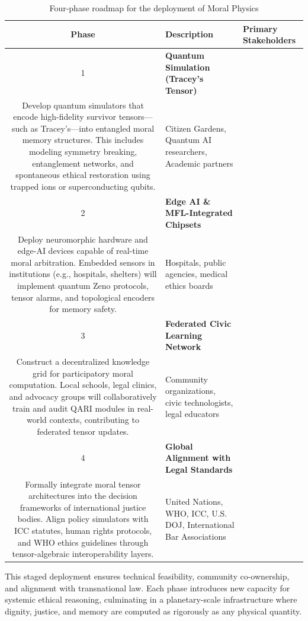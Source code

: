 \documentclass{article}
\theoremstyle{plain}
\theoremstyle{claimstyle}
\begin{document}
\begin{table}[h]
\centering
\begin{tabular}{|c|p{7cm}|p{5cm}|}
\hline
\textbf{Phase} & \textbf{Description} & \textbf{Primary Stakeholders} \\
\hline
1 & \textbf{Quantum Simulation (Tracey’s Tensor)}\\
Develop quantum simulators that encode high-fidelity survivor tensors—such as Tracey’s—into entangled moral memory structures. This includes modeling symmetry breaking, entanglement networks, and spontaneous ethical restoration using trapped ions or superconducting qubits. & Citizen Gardens, Quantum AI researchers, Academic partners \\
\hline
2 & \textbf{Edge AI \& MFL-Integrated Chipsets} \\
Deploy neuromorphic hardware and edge-AI devices capable of real-time moral arbitration. Embedded sensors in institutions (e.g., hospitals, shelters) will implement quantum Zeno protocols, tensor alarms, and topological encoders for memory safety. & Hospitals, public agencies, medical ethics boards \\
\hline
3 & \textbf{Federated Civic Learning Network} \\
Construct a decentralized knowledge grid for participatory moral computation. Local schools, legal clinics, and advocacy groups will collaboratively train and audit QARI modules in real-world contexts, contributing to federated tensor updates. & Community organizations, civic technologists, legal educators \\
\hline
4 & \textbf{Global Alignment with Legal Standards} \\
Formally integrate moral tensor architectures into the decision frameworks of international justice bodies. Align policy simulators with ICC statutes, human rights protocols, and WHO ethics guidelines through tensor-algebraic interoperability layers. & United Nations, WHO, ICC, U.S. DOJ, International Bar Associations \\
\hline
\end{tabular}
\caption{Four-phase roadmap for the deployment of Moral Physics}
\end{table}

This staged deployment ensures technical feasibility, community co-ownership, and alignment with transnational law. Each phase introduces new capacity for systemic ethical reasoning, culminating in a planetary-scale infrastructure where dignity, justice, and memory are computed as rigorously as any physical quantity.
\end{document}
